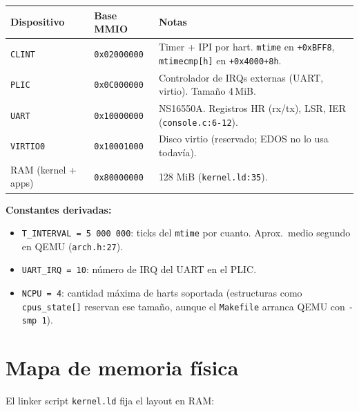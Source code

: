 \documentclass[11pt,a4paper]{article}
\begin{document}
\begin{center}
\small
\begin{tabular}{@{}lll@{}}
\toprule
Dispositivo & Base MMIO & Notas \\
\midrule
\texttt{CLINT}   & \texttt{0x02000000} & Timer + IPI por hart. \texttt{mtime} en \texttt{+0xBFF8}, \texttt{mtimecmp[h]} en \texttt{+0x4000+8h}. \\
\texttt{PLIC}    & \texttt{0x0C000000} & Controlador de IRQs externas (UART, virtio). Tamaño 4\,MiB. \\
\texttt{UART}    & \texttt{0x10000000} & NS16550A. Registros HR (rx/tx), LSR, IER (\texttt{console.c:6-12}). \\
\texttt{VIRTIO0} & \texttt{0x10001000} & Disco virtio (reservado; EDOS no lo usa todavía). \\
\midrule
RAM (kernel + apps) & \texttt{0x80000000} & 128 MiB (\texttt{kernel.ld:35}). \\
\bottomrule
\end{tabular}
\end{center}

\textbf{Constantes derivadas:}

\begin{itemize}[leftmargin=*,nosep]
    \item \texttt{T\_INTERVAL = 5\,000\,000}: ticks del \texttt{mtime}
        por cuanto. Aprox.\ medio segundo en QEMU
        (\texttt{arch.h:27}).
    \item \texttt{UART\_IRQ = 10}: número de IRQ del UART en el
        PLIC.
    \item \texttt{NCPU = 4}: cantidad máxima de harts soportada
        (estructuras como \texttt{cpus\_state[]} reservan ese tamaño,
        aunque el \texttt{Makefile} arranca QEMU con \texttt{-smp 1}).
\end{itemize}

\section{Mapa de memoria física}

El linker script \texttt{kernel.ld} fija el layout en RAM:
\end{document}
